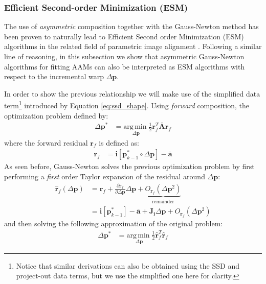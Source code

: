 \subsubsection*{Efficient Second-order Minimization (ESM)}
\label{sec:gauss_newton_alternated}

The use of \emph{asymmetric} composition together with the Gauss-Newton method has been proven to naturally lead to Efficient Second order Minimization (ESM) algorithms in the related field of parametric image alignment \cite{Malis2004, Benhimane2004, Megret2008, Megret2010}. Following a similar line of reasoning, in this subsection we show that asymmetric Gauss-Newton algorithms for fitting AAMs can also be interpreted as ESM algorithms with respect to the incremental warp $\Delta \mathbf{p}$.

In order to show the previous relationship we will make use of the simplified data term\footnote{Notice that similar derivations can also be obtained using the SSD and project-out data terms, but we use the simplified one here for clarity.} introduced by Equation \ref{eq:ssd_shape}. Using \emph{forward} composition, the optimization problem defined by:
\begin{equation}
    \begin{aligned}
        \Delta \mathbf{p}^* & = \underset{\Delta \mathbf{p}}{\mathrm{arg\,min\;}} \frac{1}{2} \mathbf{r}_f^T\bar{\mathbf{A}}\mathbf{r}_f
    \label{eq:po_forward}
    \end{aligned}
\end{equation}
where the forward residual $\mathbf{r}_f$ is defined as:
\begin{equation}
    \begin{aligned}
		\mathbf{r}_f & = \mathbf{i}[\mathbf{p}_{k-1}^* \circ \Delta \mathbf{p}] - \bar{\mathbf{a}}
    \label{eq:po_forward_residual}
    \end{aligned}
\end{equation}
As seen before, Gauss-Newton solves the previous optimization problem by first performing a \emph{first} order Taylor expansion of the residual around $\Delta \mathbf{p}$:
\begin{equation}
    \begin{aligned}
		\hat{\mathbf{r}}_f(\Delta\mathbf{p}) & = \mathbf{r}_f + \frac{\partial \mathbf{r}_f}{\partial\Delta \mathbf{p}}\Delta\mathbf{p} + \underbrace{O_{\mathbf{r}_f}(\Delta\mathbf{p}^2)}_{\textrm{remainder}}
		\\
		& = \mathbf{i}[\mathbf{p}_{k-1}^*] - \bar{\mathbf{a}} + \mathbf{J}_\mathbf{i}\Delta\mathbf{p} + O_{\mathbf{r}_f}(\Delta\mathbf{p}^2)
    \label{eq:po_forward_residual_taylor}
    \end{aligned}
\end{equation}
and then solving the following approximation of the original problem:
\begin{equation}
    \begin{aligned}
        \Delta\mathbf{p}^* & = \underset{\Delta\mathbf{p}}{\mathrm{arg\,min\;}} \frac{1}{2} \hat{\mathbf{r}}_f^T\hat{\mathbf{r}}_f
    \label{eq:po_forward_taylor}
    \end{aligned}
\end{equation}

